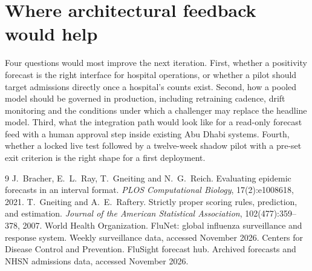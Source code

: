 \documentclass[11pt,a4paper]{article}
\begin{document}
\section{Where architectural feedback would help}

Four questions would most improve the next iteration. First, whether a positivity forecast is the right interface for hospital operations, or whether a pilot should target admissions directly once a hospital's counts exist. Second, how a pooled model should be governed in production, including retraining cadence, drift monitoring and the conditions under which a challenger may replace the headline model. Third, what the integration path would look like for a read-only forecast feed with a human approval step inside existing Abu Dhabi systems. Fourth, whether a locked live test followed by a twelve-week shadow pilot with a pre-set exit criterion is the right shape for a first deployment.

\begin{thebibliography}{9}
 J.~Bracher, E.~L.~Ray, T.~Gneiting and N.~G.~Reich. Evaluating epidemic forecasts in an interval format. \emph{PLOS Computational Biology}, 17(2):e1008618, 2021.
 T.~Gneiting and A.~E.~Raftery. Strictly proper scoring rules, prediction, and estimation. \emph{Journal of the American Statistical Association}, 102(477):359--378, 2007.
 World Health Organization. FluNet: global influenza surveillance and response system. Weekly surveillance data, accessed November 2026.
 Centers for Disease Control and Prevention. FluSight forecast hub. Archived forecasts and NHSN admissions data, accessed November 2026.
\end{thebibliography}
\end{document}
